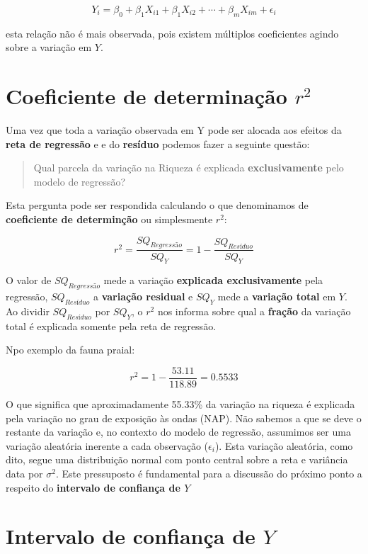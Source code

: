 \documentclass[
]{book}
\begin{document}
\[Y_i = \beta_0 + \beta_1X_{i1} + \beta_1X_{i2} + \cdots + \beta_mX_{im} + \epsilon_i\]

esta relação não é mais observada, pois existem múltiplos coeficientes agindo sobre a variação em \(Y\).

\hypertarget{coeficiente-de-determinauxe7uxe3o-r2}{%
\section{\texorpdfstring{Coeficiente de determinação \(r^2\)}{Coeficiente de determinação r\^{}2}}\label{coeficiente-de-determinauxe7uxe3o-r2}}

Uma vez que toda a variação observada em Y pode ser alocada aos efeitos da \textbf{reta de regressão} e e do \textbf{resíduo} podemos fazer a seguinte questão:

\begin{quote}
Qual parcela da variação na Riqueza é explicada \textbf{exclusivamente} pelo modelo de regressão?
\end{quote}

Esta pergunta pode ser respondida calculando o que denominamos de \textbf{coeficiente de determinção} ou simplesmente \(r^2\):

\[r^2 = \frac{SQ_{Regressão}}{SQ_Y} = 1 - \frac{SQ_{Resíduo}}{SQ_Y}\]

O valor de \(SQ_{Regressão}\) mede a variação \textbf{explicada exclusivamente} pela regressão, \(SQ_{Resíduo}\) a \textbf{variação residual} e \(SQ_Y\) mede a \textbf{variação total} em \(Y\). Ao dividir \(SQ_{Resíduo}\) por \(SQ_Y\), o \(r^2\) nos informa sobre qual a \textbf{fração} da variação total é explicada somente pela reta de regressão.

Npo exemplo da fauna praial:

\[r^2 = 1 - \frac{53.11}{118.89} = 0.5533\]

O que significa que aproximadamente 55.33\% da variação na riqueza é explicada pela variação no grau de exposição às ondas (NAP). Não sabemos a que se deve o restante da variação e, no contexto do modelo de regressão, assumimos ser uma variação aleatória inerente a cada observação (\(\epsilon_i\)). Esta variação aleatória, como dito, segue uma distribuição normal com ponto central sobre a reta e variância data por \(\sigma^2\). Este pressuposto é fundamental para a discussão do próximo ponto a respeito do \textbf{intervalo de confiança de \(Y\)}

\hypertarget{intervalo-de-confianuxe7a-de-y}{%
\section{\texorpdfstring{Intervalo de confiança de \(Y\)}{Intervalo de confiança de Y}}\label{intervalo-de-confianuxe7a-de-y}}
\end{document}
